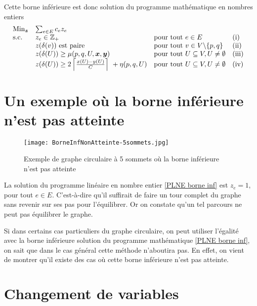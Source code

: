 Cette borne inférieure est donc solution du programme mathématique en nombres entiers
\begin{gather}\label{PLNE borne inf}
\begin{array}{llll}
  \mbox{Min}_{\boldsymbol{z}} &\sum_{e \in E} c_ez_e & & \\
  \mbox{s.c.}       &z_e \in \mathbb{Z}_+ &\mbox{pour tout } e \in E &\mbox{(i)} \\
                    &z(\delta(v)) \mbox{ est paire} &\mbox{pour tout } v \in V \backslash \{p,q\}&\mbox{(ii)} \\
                    &z(\delta(U)) \ge \mu(p,q,U,\boldsymbol{x},\boldsymbol{y}) &\mbox{pour tout } U \subseteq V, U \ne \emptyset &\mbox{(iii)} \\
                    &z(\delta(U)) \ge 2 \left\lceil \frac{x(U)-y(U)}{C} \right\rceil\ + \eta(p,q,U) &\mbox{pour tout } U \subseteq V, U \ne \emptyset &\mbox{(iv)}
\end{array}
\end{gather}

\section{Un exemple où la borne inférieure n'est pas atteinte}

\begin{figure}[ht]
  \label{Exemple de borne inf non atteinte}
  \center \texttt{[image: BorneInfNonAtteinte-5sommets.jpg]}
  \caption{Exemple de graphe circulaire à 5 sommets où la borne inférieure n'est pas atteinte}
\end{figure}

La solution du programme linéaire en nombre entier \eqref{PLNE borne inf} est $z_e = 1$, pour tout $e \in E$. C'est-à-dire qu'il suffirait de faire un tour complet du graphe sans revenir sur ses pas pour l'équilibrer. Or on constate qu'un tel parcours ne peut pas équilibrer le graphe.

Si dans certains cas particuliers du graphe circulaire, on peut utiliser l'égalité avec la borne inférieure solution du programme mathématique \eqref{PLNE borne inf}, on sait que dans le cas général cette méthode n'aboutira pas. En effet, on vient de montrer qu'il existe des cas où cette borne inférieure n'est pas atteinte.

\section{Changement de variables}
\label{Changement variables}

